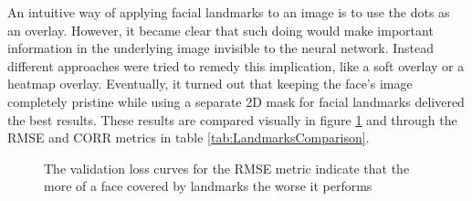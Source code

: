 An intuitive way of applying facial landmarks to an image is to use the dots as an overlay. However, it became clear that such doing would make important information in the underlying image invisible to the neural network. Instead different approaches were tried to remedy this implication, like a soft overlay or a heatmap overlay. Eventually, it turned out that keeping the face's image completely pristine while using a separate 2D mask for facial landmarks delivered the best results. These results are compared visually in figure \ref{fig:LandmarksVisualComparison} and through the RMSE and CORR metrics in table \ref{tab:LandmarksComparison}.

\begin{figure}[H]
  \begin{center}
  \hfill
  \hfill
  \hfill
  \caption{The validation loss curves for the RMSE metric indicate that the more of a face covered by landmarks the worse it performs}
  \label{fig:LandmarksVisualComparison}
  \end{center}
\end{figure}

